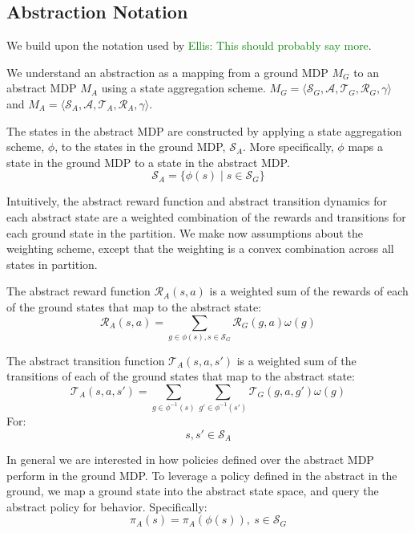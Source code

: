 \documentclass{article}
\newcommand\enote[1]{\textcolor{green}{Ellis: #1}}
\begin{document}
\subsection{Abstraction Notation}
We build upon the notation used by \cite{li2006towards} \enote{This should probably say more}.

We understand an abstraction as a mapping from a ground MDP $M_G$ to an abstract MDP $M_A$ using a state aggregation scheme. $M_G = \langle \mathcal{S}_G, \mathcal{A}, \mathcal{T}_G, \mathcal{R}_G, \gamma \rangle$ and $M_A = \langle \mathcal{S}_A, \mathcal{A}, \mathcal{T}_A, \mathcal{R}_A, \gamma \rangle$.

The states in the abstract MDP are constructed by applying a state aggregation scheme, $\phi$, to the states in the ground MDP, $\mathcal{S}_A$. More specifically, $\phi$ maps a state in the ground MDP to a state in the abstract MDP.
\begin{equation}
\mathcal{S}_A = \{ \phi(s) \mid s \in \mathcal{S}_G\}
\end{equation}

Intuitively, the abstract reward function and abstract transition dynamics for each abstract state are a weighted combination of the rewards and transitions for each ground state in the partition. We make now assumptions about the weighting scheme, except that the weighting is a convex combination across all states in partition.

The abstract reward function $\mathcal{R}_A(s,a)$ is a weighted sum of the rewards of each of the ground states that map to the abstract state:
\begin{equation}
\mathcal{R}_A(s,a) = \sum_{g \in \phi(s), s \in \mathcal{S}_G} \mathcal{R}_G(g,a) \omega(g) 
\end{equation}


The abstract transition function $\mathcal{T}_A(s,a,s')$ is a weighted sum of the transitions of each of the ground states that map to the abstract state:
\begin{equation}
\mathcal{T}_A(s,a,s') = \sum_{g \in \phi^{-1}(s)} \sum_{g' \in \phi^{-1}(s')} \mathcal{T}_G(g,a,g') \omega(g) 
\end{equation}
For:
\begin{equation}
s, s' \in \mathcal{S}_A
\end{equation}

In general we are interested in how policies defined over the abstract MDP perform in the ground MDP. To leverage a policy defined in the abstract in the ground, we map a ground state into the abstract state space, and query the abstract policy for behavior. Specifically:
\begin{equation}
\pi_A(s) = \pi_A(\phi(s)),\ s \in \mathcal{S}_G
\end{equation}
\end{document}
